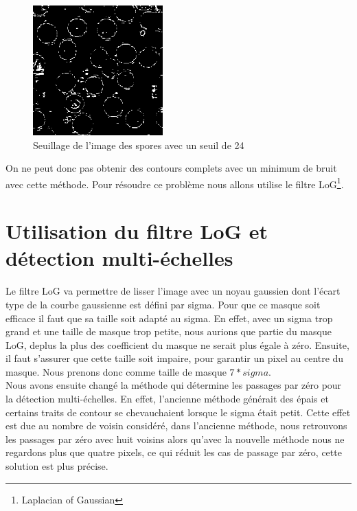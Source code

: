 \documentclass[a4paper,11pt]{article}
\begin{document}
  \begin{figure}[H]
   \center
   \includegraphics[width=5cm]{../seuillage24.png}
   \caption{Seuillage de l'image des spores avec un seuil de 24}
  \end{figure}
  
  On ne peut donc pas obtenir des contours complets avec un minimum de bruit avec cette méthode. Pour résoudre ce problème
  nous allons utilise le filtre LoG\footnote{Laplacian of Gaussian}.
  
  \section{Utilisation du filtre LoG et détection multi-échelles}
  Le filtre LoG va permettre de lisser l'image avec un noyau gaussien dont l'écart type de la courbe gaussienne est défini par
  sigma. Pour que ce masque soit efficace il faut que sa taille soit adapté au sigma. En effet, avec un sigma trop grand et 
  une taille de masque trop petite, nous aurions que partie du masque LoG, deplus la plus des coefficient du masque ne serait 
  plus égale à zéro. Ensuite, il faut s'assurer que cette taille soit impaire, pour garantir un pixel au centre du masque.
  Nous prenons donc comme taille de masque $7*sigma$.\\

  Nous avons ensuite changé la méthode qui détermine les passages par zéro pour la détection multi-échelles. En effet, 
  l'ancienne méthode générait des épais et certains traits de contour se chevauchaient lorsque le sigma était petit.
  Cette effet est due au nombre de voisin considéré, dans l'ancienne méthode, nous retrouvons les passages par zéro 
  avec huit voisins alors qu'avec la nouvelle méthode nous ne regardons plus que quatre pixels, ce qui réduit les 
  cas de passage par zéro, cette solution est plus précise.\\
  
\end{document}
